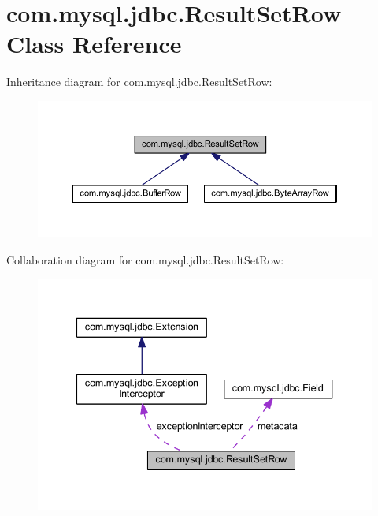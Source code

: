 \hypertarget{classcom_1_1mysql_1_1jdbc_1_1_result_set_row}{}\section{com.\+mysql.\+jdbc.\+Result\+Set\+Row Class Reference}
\label{classcom_1_1mysql_1_1jdbc_1_1_result_set_row}


Inheritance diagram for com.\+mysql.\+jdbc.\+Result\+Set\+Row\+:
\nopagebreak
\begin{figure}[H]
\begin{center}
\leavevmode
\includegraphics[width=350pt]{classcom_1_1mysql_1_1jdbc_1_1_result_set_row__inherit__graph}
\end{center}
\end{figure}


Collaboration diagram for com.\+mysql.\+jdbc.\+Result\+Set\+Row\+:
\nopagebreak
\begin{figure}[H]
\begin{center}
\leavevmode
\includegraphics[width=340pt]{classcom_1_1mysql_1_1jdbc_1_1_result_set_row__coll__graph}
\end{center}
\end{figure}
